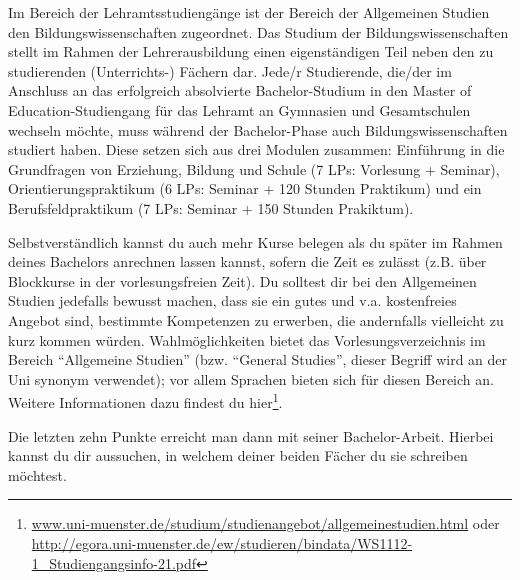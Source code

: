 Im Bereich der Lehramtsstudiengänge ist der Bereich der Allgemeinen Studien den Bildungswissenschaften zugeordnet. Das Studium der Bildungswissenschaften stellt im Rahmen der Lehrerausbildung einen eigenständigen Teil neben den zu studierenden (Unterrichts-) Fächern dar. Jede/r Studierende, die/der im Anschluss an das erfolgreich absolvierte Bachelor-Studium in den Master of Education-Studiengang für das Lehramt an Gymnasien und Gesamtschulen wechseln möchte, muss während der Bachelor-Phase auch Bildungswissenschaften studiert haben. Diese setzen sich aus drei Modulen zusammen: Einführung in die Grundfragen von Erziehung, Bildung und Schule (7 LPs: Vorlesung + Seminar), Orientierungspraktikum (6 LPs: Seminar + 120 Stunden Praktikum) und ein Berufsfeldpraktikum (7 LPs: Seminar + 150 Stunden Prakiktum).

Selbstverständlich kannst du auch mehr Kurse belegen als du später im Rahmen deines Bachelors anrechnen lassen kannst, sofern die Zeit es zulässt (z.B. über Blockkurse in der vorlesungsfreien Zeit). Du solltest dir bei den Allgemeinen Studien jedefalls bewusst machen, dass sie ein gutes und v.a. kostenfreies Angebot sind, bestimmte Kompetenzen zu erwerben, die andernfalls vielleicht zu kurz kommen würden.
Wahlmöglichkeiten bietet das Vorlesungsverzeichnis im Bereich \enquote{Allgemeine Studien} (bzw. \enquote{General Studies}, dieser Begriff wird an der Uni synonym verwendet); vor allem Sprachen bieten sich für diesen Bereich an. Weitere Informationen dazu findest du hier\footnote{\url{www.uni-muenster.de/studium/studienangebot/allgemeinestudien.html} oder \url{http://egora.uni-muenster.de/ew/studieren/bindata/WS1112-1_Studiengangsinfo-21.pdf}}.

Die letzten zehn Punkte erreicht man dann mit seiner Bachelor-Arbeit. Hierbei kannst du dir aussuchen, in welchem deiner beiden Fächer du sie schreiben möchtest.

